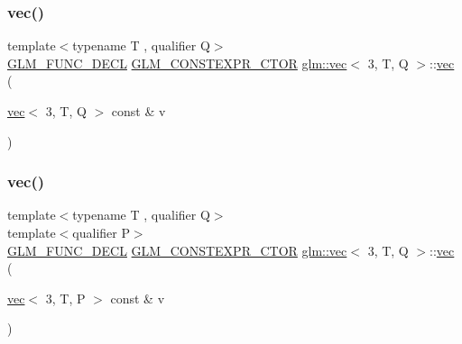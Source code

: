 \subsubsection{\texorpdfstring{vec()}{vec()}\hspace{0.1cm}{\footnotesize\ttfamily [2/23]}}
{\footnotesize\ttfamily template$<$typename T , qualifier Q$>$ \\
\mbox{\hyperlink{setup_8hpp_ab2d052de21a70539923e9bcbf6e83a51}{G\+L\+M\+\_\+\+F\+U\+N\+C\+\_\+\+D\+E\+CL}} \mbox{\hyperlink{setup_8hpp_ad34178a09666081abdb573c14d1f4a5a}{G\+L\+M\+\_\+\+C\+O\+N\+S\+T\+E\+X\+P\+R\+\_\+\+C\+T\+OR}} \mbox{\hyperlink{structglm_1_1vec}{glm\+::vec}}$<$ 3, T, Q $>$\+::\mbox{\hyperlink{structglm_1_1vec}{vec}} (\begin{DoxyParamCaption}\item[{\mbox{\hyperlink{structglm_1_1vec}{vec}}$<$ 3, T, Q $>$ const \&}]{v }\end{DoxyParamCaption})}

\mbox{\label{structglm_1_1vec_3_013_00_01_t_00_01_q_01_4_a1b43d4595236da757e4054e1a4717153}} 
\subsubsection{\texorpdfstring{vec()}{vec()}\hspace{0.1cm}{\footnotesize\ttfamily [3/23]}}
{\footnotesize\ttfamily template$<$typename T , qualifier Q$>$ \\
template$<$qualifier P$>$ \\
\mbox{\hyperlink{setup_8hpp_ab2d052de21a70539923e9bcbf6e83a51}{G\+L\+M\+\_\+\+F\+U\+N\+C\+\_\+\+D\+E\+CL}} \mbox{\hyperlink{setup_8hpp_ad34178a09666081abdb573c14d1f4a5a}{G\+L\+M\+\_\+\+C\+O\+N\+S\+T\+E\+X\+P\+R\+\_\+\+C\+T\+OR}} \mbox{\hyperlink{structglm_1_1vec}{glm\+::vec}}$<$ 3, T, Q $>$\+::\mbox{\hyperlink{structglm_1_1vec}{vec}} (\begin{DoxyParamCaption}\item[{\mbox{\hyperlink{structglm_1_1vec}{vec}}$<$ 3, T, P $>$ const \&}]{v }\end{DoxyParamCaption})}

\mbox{\label{structglm_1_1vec_3_013_00_01_t_00_01_q_01_4_a3969041c27af93819cfcc2ca0a410277}} 
